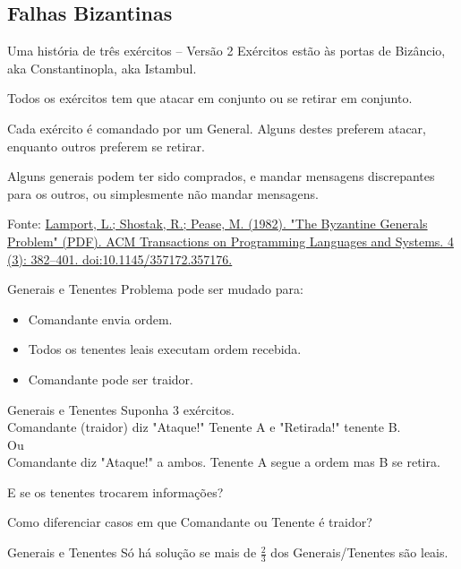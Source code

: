 
\subsection{Falhas Bizantinas}

\begin{frame}{Uma história de três exércitos -- Versão 2}
Exércitos estão às portas de Bizâncio, aka Constantinopla, aka Istambul.

Todos os exércitos tem que atacar em conjunto ou se retirar em conjunto.

Cada exército é comandado por um General. Alguns destes preferem atacar, enquanto outros preferem se retirar.

Alguns generais podem ter sido comprados, e mandar mensagens discrepantes para os outros, ou simplesmente não mandar mensagens.

Fonte: \href{http://research.microsoft.com/en-us/um/people/lamport/pubs/byz.pdf}{Lamport, L.; Shostak, R.; Pease, M. (1982). "The Byzantine Generals Problem" (PDF). ACM Transactions on Programming Languages and Systems. 4 (3): 382–401. doi:10.1145/357172.357176.}
\end{frame}

\begin{frame}{Generais e Tenentes}
Problema pode ser mudado para:
\begin{itemize}
	\item Comandante envia ordem.
	\item Todos os tenentes leais executam ordem recebida.
	\item Comandante pode ser traidor.
\end{itemize}
\end{frame}


\begin{frame}{Generais e Tenentes}
Suponha 3 exércitos. \\
Comandante (traidor) diz "Ataque!" Tenente A e "Retirada!" tenente B.\\
Ou \\
Comandante diz "Ataque!" a ambos. Tenente A segue a ordem mas B se retira.

\pause E se os tenentes trocarem informações?

\pause Como diferenciar casos em que Comandante ou Tenente é traidor?
\end{frame}




\begin{frame}{Generais e Tenentes}
Só há solução se mais de $\frac{2}{3}$ dos Generais/Tenentes são leais.
\end{frame}

